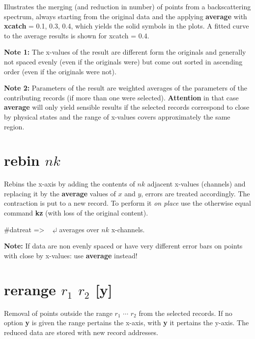 \documentclass[11pt,fleqn]{book} %
\newcommand{\linespace}{\vspace{4ex}}
\newcommand{\return}{$\carriagereturn$} %
\newcommand{\dtrprompt}{{\color{blue}\#datreat =\textgreater} ~ }
\newcommand{\cmdl}[2]{{\color{red}{\bf \underline{#1} #2}}}
\newcommand{\var}[1]{{\color{red} \bf \it #1}}
\newcommand{\opt}[1]{[#1]}
\newcommand{\expl}[1]{\hskip 0.5cm {\color{explgray} #1}}
\begin{document}
\linespace
Illustrates the merging (and reduction in number) of points from a backscattering spectrum, always
starting from the original data and the applying {\bf average} with {\bf xcatch} = 0.1, 0.3, 0.4,
which yields the solid symbols in the plots. A fitted curve to the average results is shown for 
xcatch = 0.4. 

\linespace
{\bf Note 1:} The x-values of the result are different form the originals and generally not spaced
evenly (even if the originals were) but come out sorted in ascending order (even if the originals were not).

\linespace
{\bf Note 2:} Parameters of the result are weighted averages of the parameters of the contributing
records (if more than one were selected). {\bf Attention} in that case {\bf average} will only yield
sensible results if the selected records correspond to close by physical states and the range
of x-values covers approximately the same region.

\section{rebin \var{${nk}$} } 
Rebins the x-axis by adding the contents of ${nk}$ adjacent x-values (channels) and replacing it by
the {\bf average} values of ${x}$ and ${y}$, errors are treated accordingly.
The contraction is put to a new record. To perform it \emph{on place} use the otherwise equal
command {\bf kz} (with loss of the original content).

\begin{corollary}
\dtrprompt \cmdl{rebin}{${nk}$}  \return  \expl{averages over ${nk}$ x-channels.} 
\end{corollary}

\linespace
{\bf Note:} If data are non evenly spaced or have very different error bars on points with
close by x-values: use {\bf average} instead!

\section{rerange \var{${r_1}$} \var{${r_2}$}  \opt{y}} 
Removal of points outside the range \var{${r_1}$} $\cdots$ \var{${r_2}$} from the selected records.
If no option {\bf y} is given the range pertains the x-axis, with {\bf y} it pertains the y-axis.
The reduced data are stored with new record addresses. 
\end{document}
